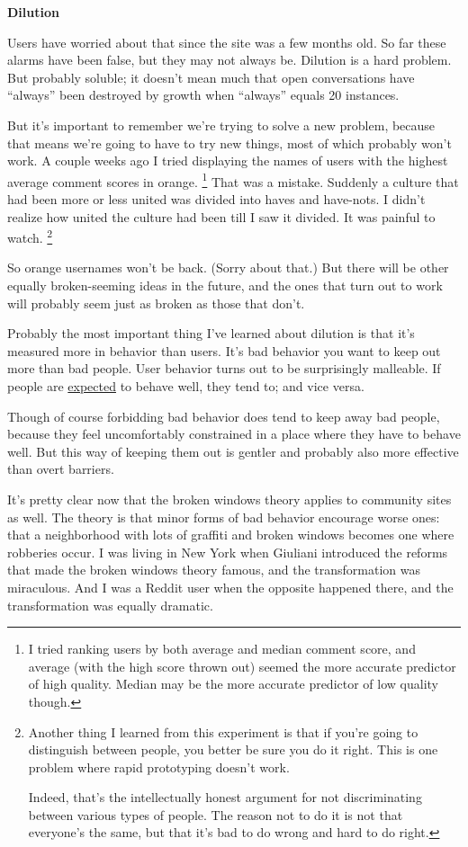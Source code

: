 \textbf{Dilution}

Users have worried about that since the site was a few months old. So
far these alarms have been false, but they may not always be. Dilution
is a hard problem. But probably soluble; it doesn't mean much that open
conversations have ``always'' been destroyed by growth when ``always''
equals 20 instances.

But it's important to remember we're trying to solve a new problem,
because that means we're going to have to try new things, most of which
probably won't work. A couple weeks ago I tried displaying the names of
users with the highest average comment scores in orange.
\footnote{I tried ranking users by both average and median comment score,
and average (with the high score thrown out) seemed the more accurate
predictor of high quality. Median may be the more accurate predictor of
low quality though.} That was a mistake. Suddenly a culture that had
been more or less united was divided into haves and have-nots. I didn't
realize how united the culture had been till I saw it divided. It was
painful to watch. \footnote{Another thing I learned from this experiment is that if you're
going to distinguish between people, you better be sure you do it right.
This is one problem where rapid prototyping doesn't work.

Indeed, that's the intellectually honest argument for not discriminating
between various types of people. The reason not to do it is not that
everyone's the same, but that it's bad to do wrong and hard to do right.}

So orange usernames won't be back. (Sorry about that.) But there will be
other equally broken-seeming ideas in the future, and the ones that turn
out to work will probably seem just as broken as those that don't.

Probably the most important thing I've learned about dilution is that
it's measured more in behavior than users. It's bad behavior you want to
keep out more than bad people. User behavior turns out to be
surprisingly malleable. If people are
\href{http://ycombinator.com/newswelcome.html}{expected} to behave well,
they tend to; and vice versa.

Though of course forbidding bad behavior does tend to keep away bad
people, because they feel uncomfortably constrained in a place where
they have to behave well. But this way of keeping them out is gentler
and probably also more effective than overt barriers.

It's pretty clear now that the broken windows theory applies to
community sites as well. The theory is that minor forms of bad behavior
encourage worse ones: that a neighborhood with lots of graffiti and
broken windows becomes one where robberies occur. I was living in New
York when Giuliani introduced the reforms that made the broken windows
theory famous, and the transformation was miraculous. And I was a Reddit
user when the opposite happened there, and the transformation was
equally dramatic.

